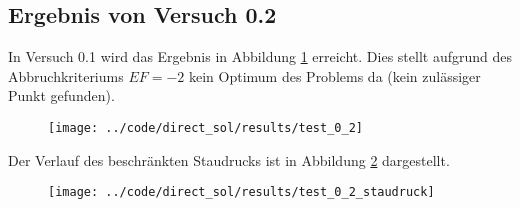 \subsection{Ergebnis von Versuch 0.2}\label{kap:Versuch02}
In Versuch 0.1 wird das Ergebnis in Abbildung \ref{img:test_0_2} erreicht. Dies stellt aufgrund des Abbruchkriteriums $EF = -2$ kein Optimum des Problems da (kein zulässiger Punkt gefunden).
\begin{figure}[H]
\begin{center}
\texttt{[image: ../code/direct\_sol/results/test\_0\_2]}
 \label{img:test_0_2}
\end{center}
\end{figure}
Der Verlauf des beschränkten Staudrucks ist in Abbildung \ref{img:test_0_2_staudruck} dargestellt.
\begin{figure}[H]
\begin{center}
\texttt{[image: ../code/direct\_sol/results/test\_0\_2\_staudruck]}
 \label{img:test_0_2_staudruck}
\end{center}
\end{figure}











\newpage
